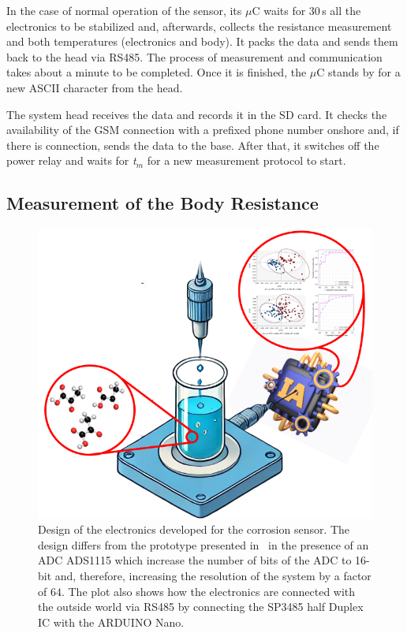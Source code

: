 \documentclass[journal,twoside,web]{ieeecolor}
\begin{document}
In the case of normal operation of the sensor, its $\mu$C waits for $30$\,s all the electronics to be stabilized and, afterwards, collects the resistance measurement and both temperatures (electronics and body). It packs the data and sends them back to the head via RS485. The process of measurement and communication takes about a minute to be completed. Once it is finished, the $\mu$C stands by for a new ASCII character from the head.

The system head receives the data and records it in the SD card. It checks the availability of the GSM connection with a prefixed phone number onshore and, if there is connection, sends the data to the base. After that, it switches off the power relay and waits for \textit{t$_{m}$} for a new measurement protocol to start.
\vspace{0.5cm}
\subsection{Measurement of the Body Resistance}
\label{ssec:resMeasProt}

\begin{figure}[!t]
\centering
\includegraphics[trim = 0mm 0mm 0mm 0mm, clip, width=1\columnwidth]{figures/fig0.png}
\caption{Design of the electronics developed for the corrosion sensor. The design differs from the prototype presented in~\cite{bengtsson2012} in the presence of an ADC ADS1115 which increase the number of bits of the ADC to 16-bit and, therefore, increasing the resolution of the system by a factor of $64$. The plot also shows how the electronics are connected with the outside world via RS485 by connecting the SP3485 half Duplex IC with the ARDUINO Nano.}
\label{fig:resMeasProt}
\vspace{-0.3cm}
\end{figure}
\end{document}
